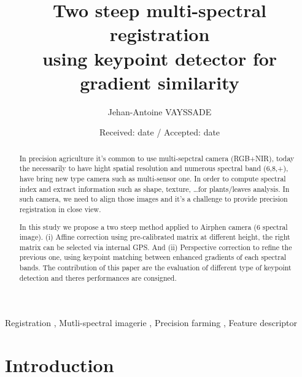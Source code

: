 \documentclass[]{elsarticle}
\begin{document}
	\onecolumn
	
	\begin{abstract}
		In precision agriculture it's common to use multi-sepctral camera (RGB+NIR),
		today the necessarily to have hight spatial resolution and numerous spectral band (6,8,+), have bring new type camera such as multi-sensor one.
		In order to compute spectral index and extract information such as shape, texture, \dots for plants/leaves analysis.
		In such camera,	we need to align those images and it's a challenge to provide precision registration in close view.
		
		In this study we propose a two steep method applied to Airphen camera (6 spectral image).
		(i) Affine correction using pre-calibrated matrix at different height, the right matrix can be selected via internal GPS.
		And (ii) Perspective correction to refine the previous one, using keypoint matching between enhanced gradients of each spectral bands.
		The contribution of this paper are the evaluation of different type of keypoint detection and theres performances are consigned.
	\end{abstract}

	\begin{keyword}
		Registration \sep
		Mutli-spectral imagerie \sep
		Precision farming \sep
		Feature descriptor
	\end{keyword}

	\begin{frontmatter}
		\title{Two steep multi-spectral registration \\ using keypoint detector for gradient similarity}
		\author[unilu]{Jehan-Antoine VAYSSADE} 
		\address[myuni]{Agrosup D2A2E pole GestAd equipe agriculture de precision 21000 Dijon, France}
		\date{Received: date / Accepted: date}
	\end{frontmatter}

	\newpage
	\twocolumn

	\section{Introduction}
	
\end{document}
